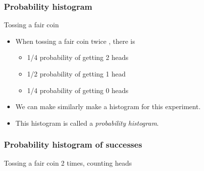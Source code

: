 \documentclass[handout]{beamer}
\begin{document}
   \begin{frame} \frametitle{Probability histogram}

   \begin{block}
     {Tossing a fair coin}
     \begin{itemize}
     \item When tossing a fair coin twice , there is
       \begin{itemize}
       \item 1/4 probability of getting 2 heads
       \item 1/2 probability of getting 1 head
       \item 1/4 probability of getting 0 heads
       \end{itemize}
       \item We can make similarly make a histogram for this experiment.
       \item This histogram is called a {\em probability histogram}.
     \end{itemize}
   \end{block}
   \end{frame}



   \begin{frame}
   \frametitle{Probability histogram of successes}
   \begin{center}
   \end{center}
   Tossing a fair coin 2 times, counting heads
   \end{frame}

\end{document}
